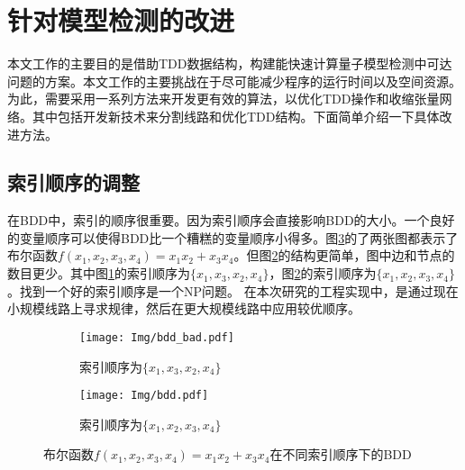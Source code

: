 \section{针对模型检测的改进}
\label{sec-optimize}
本文工作的主要目的是借助TDD数据结构，构建能快速计算量子模型检测中可达问题的方案。本文工作的主要挑战在于尽可能减少程序的运行时间以及空间资源。为此，需要采用一系列方法来开发更有效的算法，以优化TDD操作和收缩张量网络。其中包括开发新技术来分割线路和优化TDD结构。下面简单介绍一下具体改进方法。
\subsection*{索引顺序的调整}
\label{contraction}在BDD中，索引的顺序很重要。因为索引顺序会直接影响BDD的大小。一个良好的变量顺序可以使得BDD比一个糟糕的变量顺序小得多。图\ref{fig:bdd-compare}的了两张图都表示了布尔函数$f (x_1,x_2,x_3,x_4)=x_1x_2+x_3x_4$。但图\ref{fig:bdd-good}的结构更简单，图中边和节点的数目更少。其中图\ref{fig:bdd-bad}的索引顺序为$\{x_1,x_3,x_2,x_4\}$，图\ref{fig:bdd-good}的索引顺序为$\{x_1,x_2,x_3,x_4\}$。找到一个好的索引顺序是一个NP问题。
在本次研究的工程实现中，是通过现在小规模线路上寻求规律，然后在更大规模线路中应用较优顺序。
\begin{figure}[!htbp]
	\centering
	\begin{subfigure}[b]{.4\textwidth}
        \centering
        \texttt{[image: Img/bdd\_bad.pdf]}
		\caption{索引顺序为$\{x_1,x_3,x_2,x_4\}$}
		\label{fig:bdd-bad}
	\end{subfigure}
	\begin{subfigure}[b]{.4\textwidth}
        \centering
        \texttt{[image: Img/bdd.pdf]}
		\caption{索引顺序为$\{x_1,x_2,x_3,x_4\}$}
		\label{fig:bdd-good}
	\end{subfigure}
	\caption{布尔函数$f (x_1,x_2,x_3,x_4)=x_1x_2+x_3x_4$在不同索引顺序下的BDD}
	\label{fig:bdd-compare}
\end{figure}

